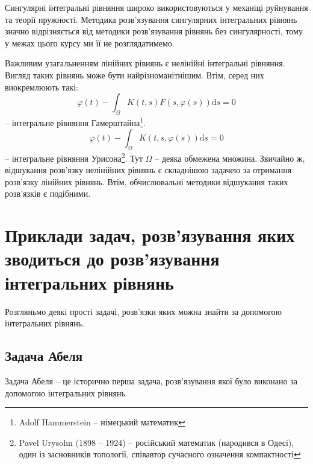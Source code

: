 \documentclass[14pt,twoside]{extreport}
\theoremstyle{mystyle}
\numberwithin{equation}{chapter}
\begin{document}
Сингулярні інтегральні рівняння широко використовуються у механіці руйнування та теорії пружності. Методика розв'язування сингулярних інтегральних рівнянь значно відрізняється від методики розв'язування рівнянь без сингулярності, тому у межах цього курсу ми її не розглядатимемо.

Важливим узагальненням лінійних рівнянь є нелінійні інтегральні рівняння. Вигляд таких рівнянь може бути найрізноманітнішим. Втім, серед них виокремлюють такі:
\begin{equation}
\varphi(t) - \int_{\Omega} K(t, s) F(s, \varphi(s)) \mathrm{d}s = 0
\end{equation}
-- інтегральне рівняння Гамерштайна\footnote{Adolf Hammerstein -- німецький математик}.
\begin{equation}
\varphi(t) - \int_{\Omega} K(t, s, \varphi(s)) \mathrm{d}s = 0
\end{equation}
-- інтегральне рівняння Урисона\footnote{Pavel Urysohn (1898 -- 1924) -- російський математик (народився в Одесі), один із засновників топології, співавтор сучасного означення компактності}. Тут $\Omega$ -- деяка обмежена множина. Звичайно ж, відшукання розв'язку нелінійних рівнянь є складнішою задачею за отримання розв'язку лінійних рівнянь. Втім, обчислювальні методики відшукання таких розв'язків є подібними.

\chapter{Приклади задач, розв'язування яких зводиться до розв'язування інтегральних рівнянь}

Розгляньмо деякі прості задачі, розв'язки яких можна знайти за допомогою інтегральних рівнянь.

\section{Задача Абеля}

Задача Абеля -- це історично перша задача, розв'язування якої було виконано за допомогою інтегральних рівнянь.
\end{document}
